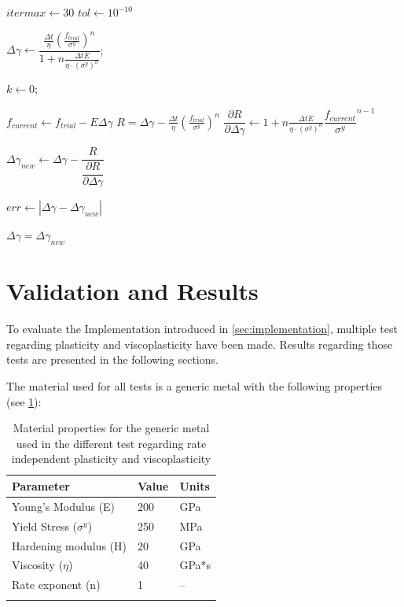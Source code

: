 \documentclass[final,5p,times,twocolumn]{elsarticle}
\begin{document}
\begin{algorithm}
  \KwOut{$\Delta \gamma$}

    $itermax \gets 30$\;
    $tol \gets 10^{-10}$\;

    $\Delta \gamma \gets \dfrac{\tfrac{\Delta t}{\eta}\left(\tfrac{f_{trial}}{\sigma^{y}}\right)^n}{1 + n \tfrac{\Delta t E}{\eta \cdot (\sigma^y)^n}}$;

    $k \gets 0$;

    {
      $f_{current} \gets f_{trial}-E\Delta \gamma$\;
      $R = \Delta \gamma - \tfrac{\Delta t}{\eta} \left(\tfrac{f_{trial}}{\sigma^{y}}\right) ^n $\;
      $\dfrac{\partial R}{\partial \Delta \gamma} \gets  1 + n \tfrac{\Delta t E}{\eta \cdot (\sigma^y)^n} \dfrac{f_{current}}{\sigma^{y}}^{n-1}$\;

      $\Delta \gamma_{new} \gets \Delta \gamma - \dfrac{R}{\dfrac{\partial R}{\partial \Delta \gamma}}$\;

      $err \gets |\Delta \gamma - \Delta \gamma_{new}|$\;

      $\Delta \gamma = \Delta \gamma_{new}$\;
    }

    

  
  \Return{$\Delta \gamma$}\;
  \caption{{$NonLinear\Delta\gamma$} Solve the plastic multiplier increment for the Perzyna-type viscoplastic model for the $n>1$ non-linear case using the Newton-Raphson algorithm}
  \label{algo:nlgamma}
\end{algorithm}

\section{Validation and Results}
\label{sec:validation}
To evaluate the Implementation introduced in \cref{sec:implementation}, multiple test regarding plasticity and viscoplasticity have been made. Results regarding those tests are presented in the following sections.

The material used for all tests is a generic metal with the following properties (see \cref{table:matprop}):

\begin{table}[H]
\centering
\caption{Material properties for the generic metal used in the different test regarding rate independent plasticity and viscoplasticity}
\begin{tabular}{ l l l }
\hline
\textbf{Parameter}        & \textbf{Value} & \textbf{Units} \\
\hline 
Young's Modulus (E)       & 200            & GPa            \\ 
Yield Stress ($\sigma^y$) & 250            & MPa            \\ 
Hardening modulus (H)     & 20             & GPa            \\ 
Viscosity ($\eta$)        & 40             & GPa*s          \\ 
Rate exponent (n)         & 1              & --             \\
\hline
\label{table:matprop} 
\end{tabular}
\end{table}
\end{document}
